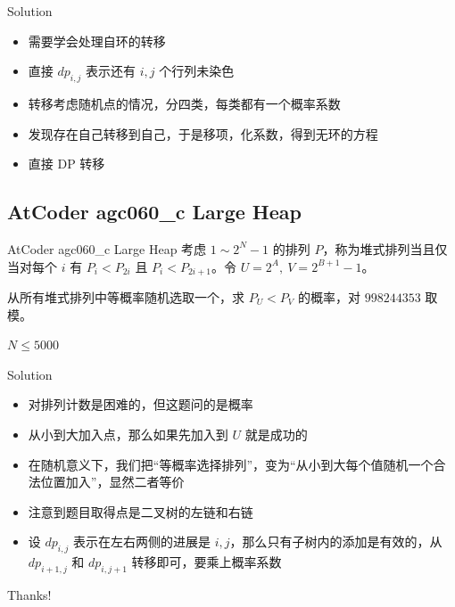 ﻿\documentclass[aspectratio=169]{ctexbeamer}
\begin{document}
\begin{frame}{Solution}
    \begin{itemize}
        \item 需要学会处理自环的转移
        \item 直接 $dp_{i,j}$ 表示还有 $i,j$ 个行列未染色
        \item 转移考虑随机点的情况，分四类，每类都有一个概率系数
        \item 发现存在自己转移到自己，于是移项，化系数，得到无环的方程
        \item 直接 DP 转移
    \end{itemize}
\end{frame}

\subsection{AtCoder agc060\_c Large Heap}
\begin{frame}{AtCoder agc060\_c Large Heap}
    考虑 $1\sim 2^N-1$ 的排列 $P$，称为堆式排列当且仅当对每个 $i$ 有 $P_i < P_{2i}$ 且 $P_i < P_{2i+1}$。令 $U=2^A,\ V=2^{B+1}-1$。
    
    从所有堆式排列中等概率随机选取一个，求 $P_U < P_V$ 的概率，对 $998244353$ 取模。
    
    $N\le 5000$
\end{frame}

\begin{frame}{Solution}
    \begin{itemize}
        \item 对排列计数是困难的，但这题问的是概率
        \item 从小到大加入点，那么如果先加入到 $U$ 就是成功的
        \item 在随机意义下，我们把“等概率选择排列”，变为“从小到大每个值随机一个合法位置加入”，显然二者等价
        \item 注意到题目取得点是二叉树的左链和右链
        \item 设 $dp_{i,j}$ 表示在左右两侧的进展是 $i,j$，那么只有子树内的添加是有效的，从 $dp_{i+1,j}$ 和 $dp_{i,j+1}$ 转移即可，要乘上概率系数
    \end{itemize}
\end{frame}


\begin{frame}
    \begin{center}
        {\Huge\calligra Thanks!}
    \end{center}
\end{frame}
\end{document}
